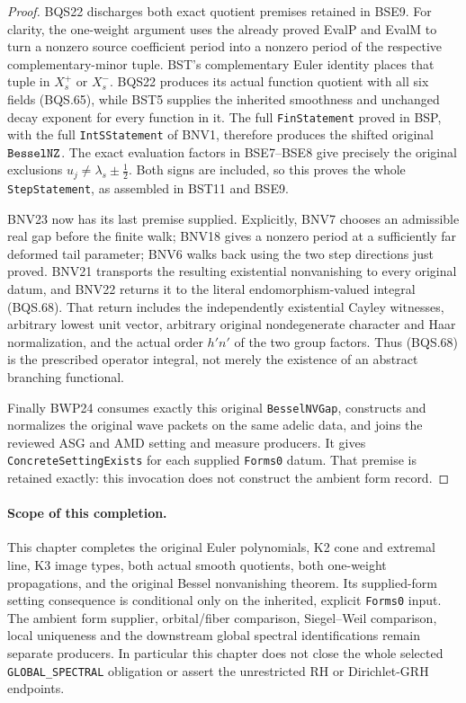 \documentclass[11pt,a4paper]{article}
\numberwithin{equation}{section}
\theoremstyle{remark}\newtheorem{remark}[theorem]{Remark}
\begin{document}
\begin{proof}
BQS22 discharges both exact quotient premises retained in BSE9.
For clarity, the one-weight argument uses the already proved
EvalP and EvalM to turn a nonzero source coefficient period
into a nonzero period of the respective complementary-minor
tuple.  BST's complementary Euler identity places that tuple
in $X_s^+$ or $X_s^-$.
BQS22 produces its actual function quotient with all six fields
(BQS.65), while BST5 supplies the inherited smoothness and
unchanged decay exponent for every function in it.
The full \texttt{Fin\allowbreak Statement} proved in BSP, with the full
\texttt{Int\allowbreak SStatement} of BNV1, therefore produces the shifted
original $\texttt{Bessel\allowbreak NZ}$.
The exact evaluation factors in BSE7--BSE8 give precisely the
original exclusions $u_j\ne\lambda_s\pm\tfrac12$.
Both signs are included, so this proves the whole
\texttt{Step\allowbreak Statement}, as assembled in BST11 and BSE9.

BNV23 now has its last premise supplied.
Explicitly, BNV7 chooses an admissible real gap before the finite
walk; BNV18 gives a nonzero period at a sufficiently far deformed
tail parameter; BNV6 walks back using the two step directions
just proved.  BNV21 transports the resulting existential
nonvanishing to every original datum, and BNV22 returns it to
the literal endomorphism-valued integral (BQS.68).
That return includes the independently existential Cayley
witnesses, arbitrary lowest unit vector, arbitrary original
nondegenerate character and Haar normalization, and the
actual order $h'n'$ of the two group factors.
Thus (BQS.68) is the prescribed operator integral, not merely
the existence of an abstract branching functional.

Finally BWP24 consumes exactly this original
\texttt{Bessel\allowbreak NVGap}, constructs and normalizes the original
wave packets on the same adelic data, and joins the reviewed
ASG and AMD setting and measure producers.
It gives \texttt{Concrete\allowbreak Setting\allowbreak Exists} for each supplied
\texttt{Forms0} datum.  That premise is retained exactly:
this invocation does not construct the ambient form record.
\end{proof}

\paragraph{Scope of this completion.}
This chapter completes the original Euler polynomials, K2 cone and
extremal line, K3 image types, both actual smooth quotients,
both one-weight propagations, and the original Bessel nonvanishing
theorem.  Its supplied-form setting consequence is conditional only
on the inherited, explicit \texttt{Forms0} input.
The ambient form supplier, orbital/fiber comparison, Siegel--Weil
comparison, local uniqueness and the downstream global spectral
identifications remain separate producers.
In particular this chapter does not close the whole selected
\texttt{GLOBAL\_\allowbreak SPECTRAL} obligation or assert the unrestricted
RH or Dirichlet-GRH endpoints.
\end{document}
